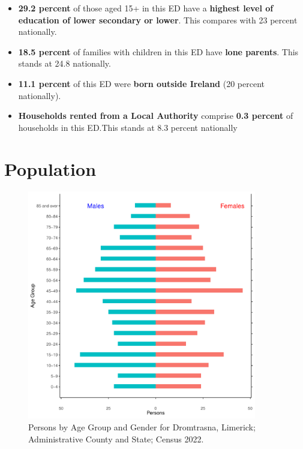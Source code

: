 \documentclass{article}
\begin{document}
\begin{itemize}
\item \textbf{29.2 percent} of those aged 15+ in this ED have a \textbf{highest level of education of lower secondary or lower}. This compares with 23 percent nationally. 

\item \textbf{18.5 percent} of families with children in this ED have \textbf{lone parents}. This stands at 24.8 nationally.

\item \textbf{11.1 percent} of this ED were \textbf{born outside Ireland} (20 percent nationally).

\item \textbf{Households rented from a Local Authority} comprise \textbf{0.3 percent} of households in this ED.This stands at 8.3 percent nationally

\end{itemize}

\pagebreak

\section{Population} 
\label{sect:Pop}

\begin{figure}[h]
	\centering
	\includegraphics[width = 100mm]{../figures/PyramidPlot.pdf}
	\caption{Persons by Age Group and Gender for Dromtrasna, Limerick; Administrative County and State; Census 2022.}
	\label{fig:2ae19629-1a6a-13a3-e055-000000000001}
	\end{figure}
\end{document}
